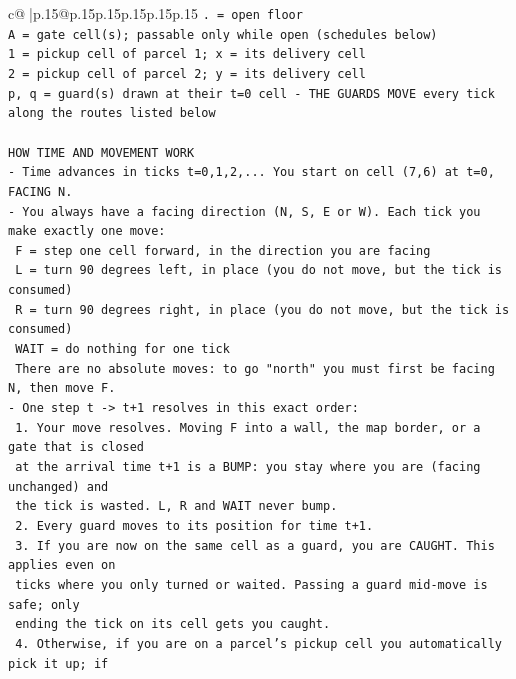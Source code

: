 \documentclass{article}
\begin{document}
{\begin{supertabular}{c@{$\;$}|p{.15\linewidth}@{}p{.15\linewidth}p{.15\linewidth}p{.15\linewidth}p{.15\linewidth}p{.15\linewidth}}
{{{\texttt{. = open floor} \\
\texttt{A = gate cell(s); passable only while open (schedules below)} \\
\texttt{1 = pickup cell of parcel 1; x = its delivery cell} \\
\texttt{2 = pickup cell of parcel 2; y = its delivery cell} \\
\texttt{p, q = guard(s) drawn at their t=0 cell {-} THE GUARDS MOVE every tick along the routes listed below} \\
\\ 
\texttt{HOW TIME AND MOVEMENT WORK} \\
\texttt{{-} Time advances in ticks t=0,1,2,... You start on cell (7,6) at t=0, FACING N.} \\
\texttt{{-} You always have a facing direction (N, S, E or W). Each tick you make exactly one move:} \\
\texttt{  F    = step one cell forward, in the direction you are facing} \\
\texttt{  L    = turn 90 degrees left, in place (you do not move, but the tick is consumed)} \\
\texttt{  R    = turn 90 degrees right, in place (you do not move, but the tick is consumed)} \\
\texttt{  WAIT = do nothing for one tick} \\
\texttt{  There are no absolute moves: to go "north" you must first be facing N, then move F.} \\
\texttt{{-} One step t {-}> t+1 resolves in this exact order:} \\
\texttt{  1. Your move resolves. Moving F into a wall, the map border, or a gate that is closed} \\
\texttt{     at the arrival time t+1 is a BUMP: you stay where you are (facing unchanged) and} \\
\texttt{     the tick is wasted. L, R and WAIT never bump.} \\
\texttt{  2. Every guard moves to its position for time t+1.} \\
\texttt{  3. If you are now on the same cell as a guard, you are CAUGHT. This applies even on} \\
\texttt{     ticks where you only turned or waited. Passing a guard mid{-}move is safe; only} \\
\texttt{     ending the tick on its cell gets you caught.} \\
\texttt{  4. Otherwise, if you are on a parcel's pickup cell you automatically pick it up; if} \\
}}}
\end{supertabular}}
\end{document}
